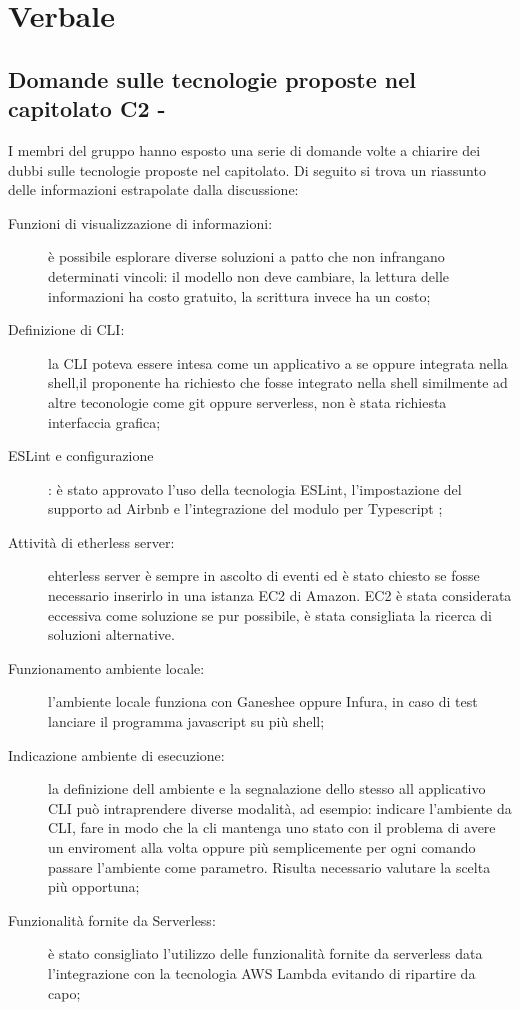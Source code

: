 \section{Verbale}
\subsection{Domande sulle tecnologie proposte nel capitolato C2 - \NomeProgetto}
I membri del gruppo hanno esposto una serie di domande volte a chiarire dei dubbi sulle tecnologie proposte nel capitolato.
Di seguito si trova un riassunto delle informazioni estrapolate dalla discussione:
\begin{description}
	\item[Funzioni di visualizzazione di informazioni:] è possibile esplorare diverse soluzioni a patto che non infrangano determinati vincoli: il modello non deve cambiare, la lettura delle informazioni ha costo gratuito, la scrittura invece ha un costo;
	\item[Definizione di CLI:] la CLI poteva essere intesa come un applicativo a se oppure integrata nella shell,il proponente ha richiesto che fosse integrato nella shell similmente ad altre teconologie come git oppure serverless, non è stata richiesta interfaccia grafica;
	\item[ESLint e configurazione]: è stato approvato l'uso della tecnologia ESLint, l'impostazione del supporto ad Airbnb e l'integrazione del modulo per Typescript ;
	\item[Attività di etherless server:] ehterless server è sempre in ascolto di eventi ed è stato chiesto se fosse necessario inserirlo in una istanza EC2 di Amazon. EC2 è stata considerata eccessiva come soluzione se pur possibile, è stata consigliata la ricerca di soluzioni alternative. 
	\item[Funzionamento ambiente locale: ] l'ambiente locale funziona con Ganeshee oppure Infura, in caso di test lanciare il programma javascript su più shell;
	\item[Indicazione ambiente di esecuzione:] la definizione dell ambiente e la segnalazione dello stesso all applicativo CLI può intraprendere diverse modalità, ad esempio: indicare l'ambiente da CLI, fare in modo che la cli mantenga uno stato con il problema di avere un enviroment alla volta oppure più semplicemente per ogni comando passare l'ambiente come parametro. Risulta necessario valutare la scelta più opportuna;	
	\item[Funzionalità fornite da Serverless:] è stato consigliato l'utilizzo delle funzionalità fornite da serverless data l'integrazione con la tecnologia AWS Lambda evitando di ripartire da capo;

\end{description}
